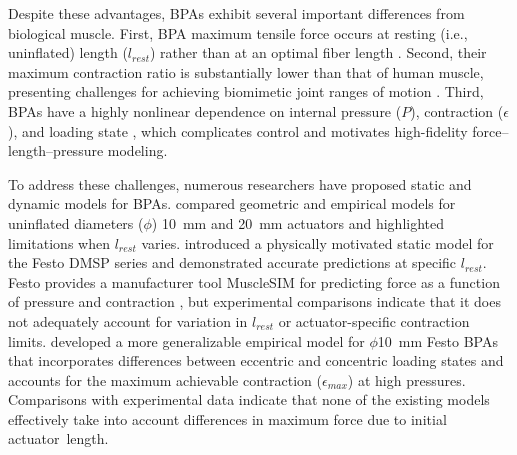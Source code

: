 \documentclass[actuators,article,accept,pdftex,moreauthors]{Definitions/mdpi}
\begin{document}
Despite these advantages, BPAs exhibit several important differences from biological muscle. First, BPA maximum tensile force occurs at resting (i.e., uninflated) {length} %
 ($l_{rest}$) rather than at an optimal fiber length \citep{liang_comparative_2020}. Second, their maximum contraction ratio is substantially lower than that of human muscle, presenting challenges for achieving biomimetic joint ranges of motion \citep{hunt_modeling_2017, sarosi_comparative_2017, liang_comparative_2020}. Third, BPAs have a highly nonlinear dependence on internal pressure ($P$), contraction ($\epsilon$), and loading state \citep{hunt_modeling_2017, martens_modeling_2017}, which complicates control and motivates high-fidelity force–length–pressure modeling.

To address these challenges, numerous researchers have proposed static and dynamic models for BPAs. \citet{sarosi_comparative_2017} compared geometric and empirical models for uninflated diameters ($\phi$) \qty{10}{\mm} and \qty{20}{\mm} actuators and highlighted limitations when $l_{rest}$ varies. \citet{martens_modeling_2017} introduced a physically motivated static model for the {Festo} %
 DMSP series and demonstrated accurate predictions at specific $l_{rest}$. Festo provides a manufacturer tool MuscleSIM for predicting force as a function of pressure and contraction \citep{lang_robert_musclesim_2005}, but experimental comparisons indicate that it does not adequately account for variation in $l_{rest}$ or actuator-specific contraction limits. \citet{hunt_modeling_2017} developed a more generalizable empirical model for $\phi$\qty{10}{\mm} Festo BPAs that incorporates differences between eccentric and concentric loading states and accounts for the maximum achievable contraction ($\epsilon_{max}$) at high pressures. Comparisons with experimental data indicate that none of the existing models effectively take into account differences in maximum force due to initial \mbox{actuator length.}
\end{document}
